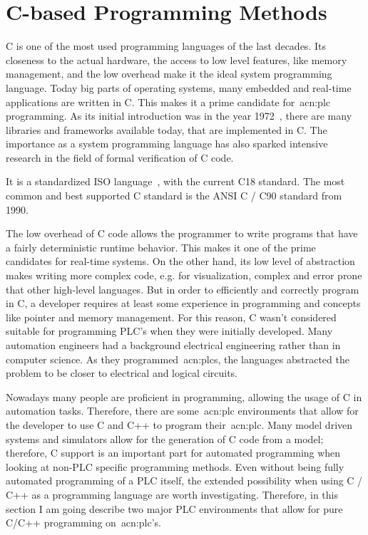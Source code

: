 \section{C-based Programming Methods}
\label{sec:c_methods}

C is one of the most used programming languages of the last decades.
Its closeness to the actual hardware, the access to low level features, like memory management, and the low overhead make it the ideal system programming language.
Today big parts of operating systems, many embedded and real-time applications are written in C.
This makes it a prime candidate for~\acrshort{acn:plc} programming.
As its initial introduction was in the year 1972~\cite{10.5555/576122}, there are many libraries and frameworks available today, that are implemented in C.
The importance as a system programming language has also sparked intensive research in the field of formal verification of C code.

It is a standardized ISO language~\cite{ISO:9899:2018}, with the current C18 standard.
The most common and best supported C standard is the ANSI C / C90 standard from 1990.

The low overhead of C code allows the programmer to write programs that have a fairly deterministic runtime behavior.
This makes it one of the prime candidates for real-time systems.
On the other hand, its low level of abstraction makes writing more complex code, e.g. for visualization, complex and error prone that other high-level languages.
But in order to efficiently and correctly program in C, a developer requires at least some experience in programming and concepts like pointer and memory management.
For this reason, C wasn't considered suitable for programming PLC's when they were initially developed.
Many automation engineers had a background electrical engineering rather than in computer science.
As they programmed~\acrshort{acn:plc}s, the languages abstracted the problem to be closer to electrical and logical circuits.

Nowadays many people are proficient in programming, allowing the usage of C in automation tasks.
Therefore, there are some~\acrshort{acn:plc} environments that allow for the developer to use C and C++ to program their~\acrshort{acn:plc}.
Many model driven systems and simulators allow for the generation of C code from a model; therefore, C support is an important part for automated programming when looking at non-PLC specific programming methods.
Even without being fully automated programming of a PLC itself, the extended possibility when using C / C++ as a programming language are worth investigating.
Therefore, in this section I am going describe two major PLC environments that allow for pure C/C++ programming on~\acrshort{acn:plc}'s.

